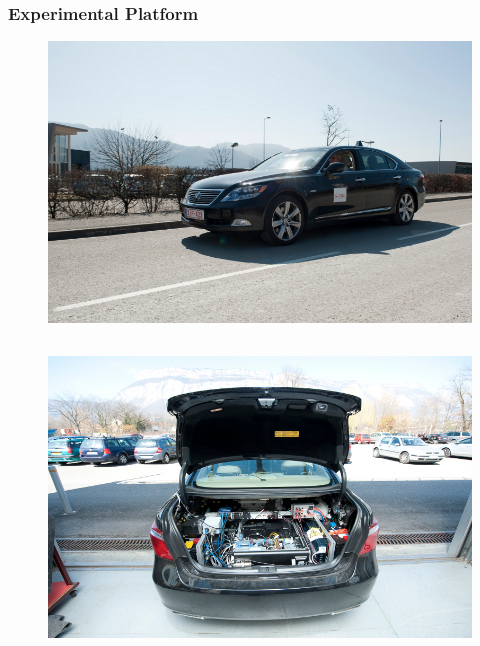 \documentclass{beamer}
\begin{document}
\begin{frame}
	\end{frame}

	\begin{frame}
		\frametitle{Experimental Platform}
		\begin{figure}[h]
			\center
			\includegraphics[scale=0.8]{../img/testbed:car}
		  \end{figure}		
		
		  \begin{columns}[t]
		  \begin{column}{5cm}
		  \begin{figure}[h]
			\center
			\includegraphics[scale=0.7]{../img/testbed:trunc}
		  \end{figure}
		  \end{column}
		  

\end{columns}
\end{frame}
\end{document}
